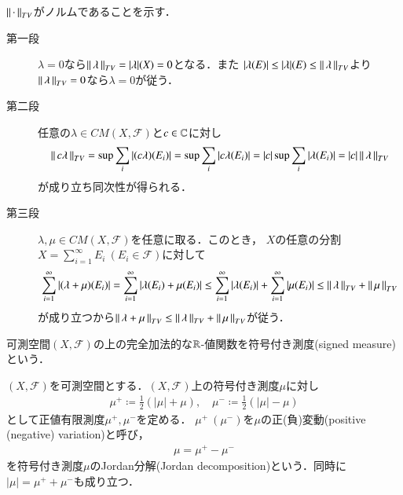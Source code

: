 	\begin{prf}\mbox{}
		$\left\|\, \cdot\, \right\|_{TV}$がノルムであることを示す．
		\begin{description}
			\item[第一段]
				$\lambda = 0$なら$\left\|\, \lambda\, \right\|_{TV} = |\lambda|(X) = 0$となる．また
				$|\lambda(E)| \leq |\lambda|(E) \leq \left\|\, \lambda\, \right\|_{TV}$より
				$\left\|\, \lambda\, \right\|_{TV} = 0$なら$\lambda=0$が従う．
			
			\item[第二段]
				任意の$\lambda \in CM(X,\mathscr{F})$と$c \in \mathbb{C}$に対し
				\begin{align}
					\left\|\, c\lambda\, \right\|_{TV} = \operatorname*{sup}_{} \sum_{i}|(c\lambda)(E_i)| = \operatorname*{sup}_{} \sum_{i}|c\lambda(E_i)| = |c|\operatorname*{sup}_{} \sum_{i}|\lambda(E_i)| = |c|\left\|\, \lambda\, \right\|_{TV}
				\end{align}
				が成り立ち同次性が得られる．
			
			\item[第三段]
				$\lambda,\mu \in CM(X,\mathscr{F})$を任意に取る．このとき，
				$X$の任意の分割$X = \sum_{i=1}^\infty E_i\ (E_i \in \mathscr{F})$に対して
				\begin{align}
					\sum_{i=1}^\infty |(\lambda + \mu)(E_i)| 
					= \sum_{i=1}^\infty |\lambda(E_i) + \mu(E_i)| 
					\leq \sum_{i=1}^\infty |\lambda(E_i)| + \sum_{i=1}^\infty |\mu(E_i)| \leq \left\|\, \lambda\, \right\|_{TV} + \left\|\, \mu\, \right\|_{TV}
				\end{align}
				が成り立つから$\left\|\, \lambda + \mu\, \right\|_{TV} \leq \left\|\, \lambda\, \right\|_{TV} + \left\|\, \mu\, \right\|_{TV}$が従う．
				\QED
		\end{description}
	\end{prf}
	
	可測空間$(X,\mathscr{F})$の上の完全加法的な$\mathbb{R}$-値関数を符号付き測度(signed measure)という．
	\begin{screen}
		\begin{dfn}
			$(X,\mathscr{F})$を可測空間とする．$(X,\mathscr{F})$上の符号付き測度$\mu$に対し
			\begin{align}
				\mu^+ \coloneqq \frac{1}{2}(|\mu| + \mu) , \quad \mu^- \coloneqq \frac{1}{2}(|\mu| - \mu)
			\end{align}
			として正値有限測度$\mu^+,\mu^-$を定める．
			$\mu^+\ (\mu^-)$を$\mu$の正(負)変動(positive (negative) variation)と呼び，
			\begin{align}
				\mu = \mu^+ - \mu^-
			\end{align}
			を符号付き測度$\mu$のJordan分解(Jordan decomposition)という．同時に$|\mu| = \mu^+ + \mu^-$も成り立つ．
		\end{dfn}
	\end{screen}
	
